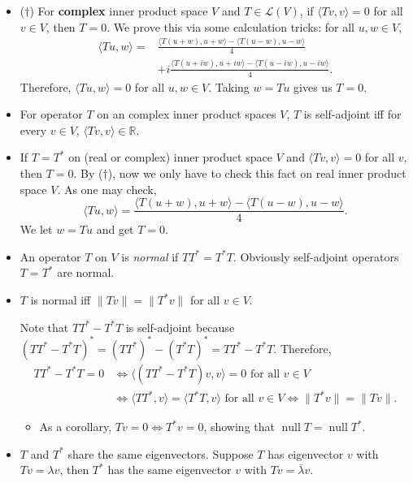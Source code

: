 \documentclass{article}
\newcommand{\R}{\mathbb{R}}
\newcommand{\n}{\operatorname{null}}
\newcommand{\conj}[1]{\overline{#1}}
\newcommand{\inp}[2]{\langle #1, #2 \rangle}
\newcommand{\nm}[1]{\| #1 \|}
\newcommand{\LV}{\mathcal{L}(V)}
\begin{document}
\begin{itemize}
    \item ($\dagger$) For \textbf{complex} inner product space $V$ and $T \in \LV$, if $\inp{Tv}{v}=0$ for all $v \in V$, then $T = 0$. We prove this via some calculation tricks: for all $u,w \in V$,
    \begin{align*}
        \inp{Tu}{w} = & \frac{\inp{T(u+w)}{u+w} - \inp{T(u-w)}{u-w}}{4} \\ & + i \frac{\inp{T(u+iw)}{u+iw} - \inp{T(u-iw)}{u-iw}}{4}.
    \end{align*}
    Therefore, $\inp{Tu}{w} = 0$ for all $u,w \in V$. Taking $w = Tu$ gives us $T = 0$.
    \item For operator $T$ on an complex inner product spaces $V$, $T$ is self-adjoint iff for every $v \in V$, $\inp{Tv}{v} \in \R$.
    \item If $T = T^*$ on (real or complex) inner product space $V$ and $\inp{Tv}{v}=0$ for all $v$, then $T = 0$. By ($\dagger$), now we only have to check this fact on real inner product space $V$. As one may check, $$\inp{Tu}{w} = \frac{\inp{T(u+w)}{u+w}-\inp{T(u-w)}{u-w}}{4}.$$ We let $w = Tu$ and get $T = 0$.
    \item An operator $T$ on $V$ is \textit{normal} if $TT^* = T^*T$. Obviously self-adjoint operators $T = T^*$ are normal.
    \item $T$ is normal iff $\nm{Tv}=\nm{T^*v}$ for all $v \in V$.
    
    Note that $TT^* - T^*T$ is self-adjoint because $(TT^*-T^*T)^*=(TT^*)^*-(T^*T)^*=TT^* - T^*T$. Therefore,
    \begin{align*}
        TT^*-T^*T=0 & \iff \inp{(TT^*-T^*T)v}{v}=0 \text{ for all } v \in V \\ & \iff \inp{TT^*}{v} = \inp{T^*T}{v} \text{ for all } v \in V \iff \nm{T^*v}=\nm{Tv}.
    \end{align*}
    \begin{itemize}
        \item As a corollary, $Tv = 0 \iff T^*v = 0$, showing that $\n T = \n T^*$.
    \end{itemize}
    \item $T$ and $T^*$ share the same eigenvectors. Suppose $T$ has eigenvector $v$ with $Tv = \lambda v$, then $T^*$ has the same eigenvector $v$ with $Tv = \conj{\lambda}v$.
    

\end{itemize}
\end{document}
